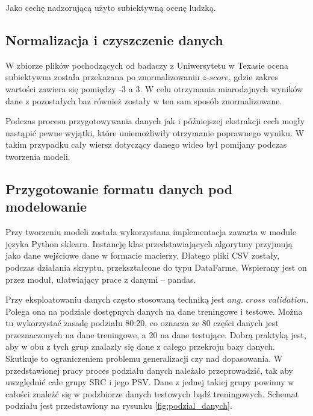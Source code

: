 Jako cechę nadzorującą użyto subiektywną ocenę ludzką.\par

\subsection{Normalizacja i czyszczenie danych}
W zbiorze plików pochodzących od badaczy z Uniwersytetu w Texasie ocena subiektywna została przekazana po znormalizowaniu $z$-$score$, gdzie zakres wartości zawiera się pomiędzy -3 a 3. W celu otrzymania miarodajnych wyników dane z pozostałych baz również zostały w ten sam sposób znormalizowane.\par
Podczas procesu przygotowywania danych jak i późniejszej ekstrakcji cech mogły nastąpić pewne wyjątki, które uniemożliwiły otrzymanie poprawnego wyniku. W takim przypadku cały wiersz dotyczący danego wideo był pomijany podczas tworzenia modeli.

\subsection{Przygotowanie formatu danych pod modelowanie}

Przy tworzeniu modeli została wykorzystana implementacja zawarta w module języka Python sklearn. Instancję klas przedstawiających algorytmy przyjmują jako dane wejściowe dane w formacie macierzy. Dlatego pliki CSV zostały, podczas działania skryptu, przekształcone do typu DataFarme. Wspierany jest on przez moduł, ułatwiający prace z danymi -- pandas.\par

Przy eksploatowaniu danych często stosowaną techniką jest $ang.$ $cross$ $validation$. Polega ona na podziale dostępnych danych na dane treningowe i testowe. Można tu wykorzystać zasadę podziału 80:20, co oznacza ze 80 części danych jest przeznaczonych na dane treningowe, a 20 na dane testujące. Dobrą praktyką jest, aby w obu z tych grup znalazły się dane z całego przekroju bazy danych. Skutkuje to ograniczeniem problemu generalizacji czy nad dopasowania. W przedstawionej pracy proces podziału danych należało przeprowadzić, tak aby uwzględnić  całe grupy SRC i jego PSV. Dane z jednej takiej grupy powinny w całości znaleźć się w podzbiorze danych testowych bądź treningowych. Schemat podziału jest przedstawiony na rysunku \ref{fig:podzial_danych}.

